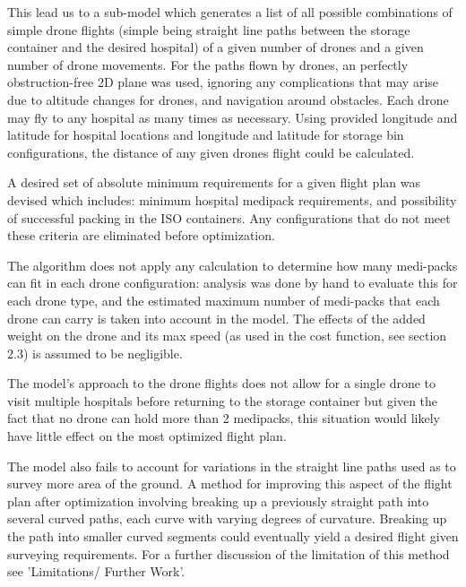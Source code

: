 \documentclass[twocolumn,10pt]{asme2ej}
\begin{document}
This lead us to a sub-model which generates a list of all possible combinations of simple drone flights (simple being straight line paths between the storage container and the desired hospital) of a given number of drones and a given number of drone movements. For the paths flown by drones, an perfectly obstruction-free 2D plane was used, ignoring any complications that may arise due to altitude changes for drones, and navigation around obstacles. Each drone may fly to any hospital as many times as necessary. Using provided longitude and latitude for hospital locations and longitude and latitude for storage bin configurations, the distance of any given drones flight could be calculated. 

A desired set of absolute minimum requirements for a given flight plan was devised which includes: minimum hospital medipack requirements, and possibility of successful packing in the ISO containers. Any configurations that do not meet these criteria are eliminated before optimization. 

The algorithm does not apply any calculation to determine how many medi-packs can fit in each drone configuration: analysis was done by hand to evaluate this for each drone type, and the estimated maximum number of medi-packs that each drone can carry is taken into account in the model. The effects of the added weight on the drone and its max speed (as used in the cost function, see section 2.3) is assumed to be negligible. 

The model's approach to the drone flights does not allow for a single drone to visit multiple hospitals before returning to the storage container but given the fact that no drone can hold more than 2 medipacks, this situation would likely have little effect on the most optimized flight plan. 

The model also fails to account for variations in the straight line paths used as to survey more area of the ground. A method for improving this aspect of the flight plan after optimization involving breaking up a previously straight path into several curved paths, each curve with varying degrees of curvature. Breaking up the path into smaller curved segments could eventually yield a desired flight given surveying requirements. For a further discussion of the limitation of this method see 'Limitations/ Further Work'.
\end{document}

